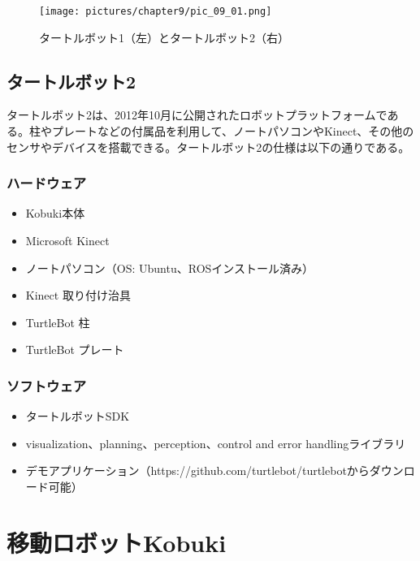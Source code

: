 \begin{figure}[htp]
  \centering
  \texttt{[image: pictures/chapter9/pic\_09\_01.png]}
  \caption{タートルボット1（左）とタートルボット2（右）}
\end{figure}

\subsection{タートルボット2}

タートルボット2は、2012年10月に公開されたロボットプラットフォームである。柱やプレートなどの付属品を利用して、ノートパソコンやKinect、その他のセンサやデバイスを搭載できる。タートルボット2の仕様は以下の通りである。

\subsubsection{ハードウェア}
\begin{itemize}
\item Kobuki本体
\item Microsoft Kinect
\item ノートパソコン（OS: Ubuntu、ROSインストール済み）
\item Kinect 取り付け治具
\item TurtleBot 柱
\item TurtleBot プレート
\end{itemize}

\subsubsection{ソフトウェア}
\begin{itemize}
\item タートルボットSDK
\item visualization、planning、perception、control and error handlingライブラリ
\item デモアプリケーション（https://github.com/turtlebot/turtlebotからダウンロード可能）
\end{itemize}

\section{移動ロボットKobuki}
\label{section:kobuki}

